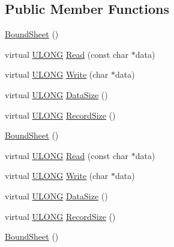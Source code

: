 \subsection*{Public Member Functions}
\begin{DoxyCompactItemize}
\item 
\hyperlink{struct_y_excel_1_1_workbook_1_1_bound_sheet_a0098cd604c12d16daebd2457c1755b85}{Bound\+Sheet} ()
\item 
virtual \hyperlink{_basic_excel_8hpp_abe09d1bea023be6a07cbadde8e955435}{U\+L\+O\+N\+G} \hyperlink{struct_y_excel_1_1_workbook_1_1_bound_sheet_a8e5ecab36a57f8ee0218b63da907dca7}{Read} (const char $\ast$data)
\item 
virtual \hyperlink{_basic_excel_8hpp_abe09d1bea023be6a07cbadde8e955435}{U\+L\+O\+N\+G} \hyperlink{struct_y_excel_1_1_workbook_1_1_bound_sheet_a309110f0412a6aca8f00c41e921481d9}{Write} (char $\ast$data)
\item 
virtual \hyperlink{_basic_excel_8hpp_abe09d1bea023be6a07cbadde8e955435}{U\+L\+O\+N\+G} \hyperlink{struct_y_excel_1_1_workbook_1_1_bound_sheet_a6f935037e5fd399794fa3df9646af979}{Data\+Size} ()
\item 
virtual \hyperlink{_basic_excel_8hpp_abe09d1bea023be6a07cbadde8e955435}{U\+L\+O\+N\+G} \hyperlink{struct_y_excel_1_1_workbook_1_1_bound_sheet_a3694298161e486289950f1eea55b49be}{Record\+Size} ()
\item 
\hyperlink{struct_y_excel_1_1_workbook_1_1_bound_sheet_a0098cd604c12d16daebd2457c1755b85}{Bound\+Sheet} ()
\item 
virtual \hyperlink{_basic_excel_8hpp_abe09d1bea023be6a07cbadde8e955435}{U\+L\+O\+N\+G} \hyperlink{struct_y_excel_1_1_workbook_1_1_bound_sheet_adb930a36f5665c2a3a436c14316fab2f}{Read} (const char $\ast$data)
\item 
virtual \hyperlink{_basic_excel_8hpp_abe09d1bea023be6a07cbadde8e955435}{U\+L\+O\+N\+G} \hyperlink{struct_y_excel_1_1_workbook_1_1_bound_sheet_a63d4d314587ea5b4d06eb8ac3ffcd71b}{Write} (char $\ast$data)
\item 
virtual \hyperlink{_basic_excel_8hpp_abe09d1bea023be6a07cbadde8e955435}{U\+L\+O\+N\+G} \hyperlink{struct_y_excel_1_1_workbook_1_1_bound_sheet_a5284d8dd33f7549190af724c7ab1191c}{Data\+Size} ()
\item 
virtual \hyperlink{_basic_excel_8hpp_abe09d1bea023be6a07cbadde8e955435}{U\+L\+O\+N\+G} \hyperlink{struct_y_excel_1_1_workbook_1_1_bound_sheet_ab587844e84815a4108be2d487a468410}{Record\+Size} ()
\item 
\hyperlink{struct_y_excel_1_1_workbook_1_1_bound_sheet_a0098cd604c12d16daebd2457c1755b85}{Bound\+Sheet} ()

\end{DoxyCompactItemize}
